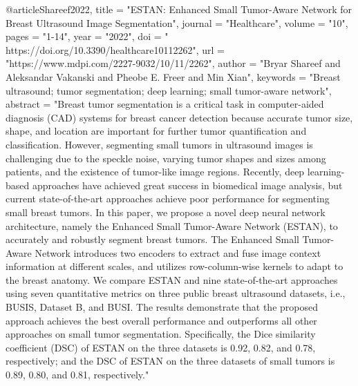 @article{Shareef2022,
title = "ESTAN: Enhanced Small Tumor-Aware Network for Breast Ultrasound Image Segmentation",
journal = "Healthcare",
volume = "10",
pages = "1-14",
year = "2022",
doi = " https://doi.org/10.3390/healthcare10112262",
url = "https://www.mdpi.com/2227-9032/10/11/2262",
author = "Bryar Shareef and Aleksandar Vakanski and Pheobe E. Freer and Min Xian",
keywords = "Breast ultrasound; tumor segmentation; deep learning; small tumor-aware network",
abstract = "Breast tumor segmentation is a critical task in computer-aided diagnosis (CAD) systems for breast cancer detection because accurate tumor size, shape, and location are important for further tumor quantification and classification. However, segmenting small tumors in ultrasound images is challenging due to the speckle noise, varying tumor shapes and sizes among patients, and the existence of tumor-like image regions. Recently, deep learning-based approaches have achieved great success in biomedical image analysis, but current state-of-the-art approaches achieve poor performance for segmenting small breast tumors. In this paper, we propose a novel deep neural network architecture, namely the Enhanced Small Tumor-Aware Network (ESTAN), to accurately and robustly segment breast tumors. The Enhanced Small Tumor-Aware Network introduces two encoders to extract and fuse image context information at different scales, and utilizes row-column-wise kernels to adapt to the breast anatomy. We compare ESTAN and nine state-of-the-art approaches using seven quantitative metrics on three public breast ultrasound datasets, i.e., BUSIS, Dataset B, and BUSI. The results demonstrate that the proposed approach achieves the best overall performance and outperforms all other approaches on small tumor segmentation. Specifically, the Dice similarity coefficient (DSC) of ESTAN on the three datasets is 0.92, 0.82, and 0.78, respectively; and the DSC of ESTAN on the three datasets of small tumors is 0.89, 0.80, and 0.81, respectively."
}